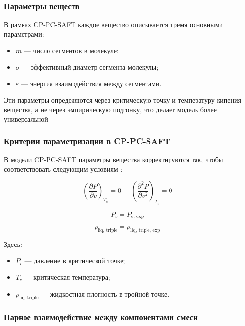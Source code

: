 \documentclass[a4paper,12pt]{article}
\begin{document}
\subsubsection{Параметры веществ}

В рамках CP-PC-SAFT каждое вещество описывается тремя основными параметрами:
\begin{itemize}
    \item \( m \) — число сегментов в молекуле;
    \item \( \sigma \) — эффективный диаметр сегмента молекулы;
    \item \( \varepsilon \) — энергия взаимодействия между сегментами.
\end{itemize}

Эти параметры определяются через критическую точку и температуру кипения вещества, а не через эмпирическую подгонку, что делает модель более универсальной.

\subsubsection{Критерии параметризации в CP-PC-SAFT}

В модели CP-PC-SAFT параметры вещества корректируются так, чтобы соответствовать следующим условиям \cite{polishuk2014standardized}:

\begin{equation}
\left( \frac{\partial P}{\partial v} \right)_{T_c} = 0, \quad
\left( \frac{\partial^2 P}{\partial v^2} \right)_{T_c} = 0
\end{equation}

\begin{equation}
P_c = P_{\text{c, exp}}
\end{equation}

\begin{equation}
\rho_{\text{liq, triple}} = \rho_{\text{liq, triple, exp}}
\end{equation}

Здесь:
\begin{itemize}
    \item \( P_c \) — давление в критической точке;
    \item \( T_c \) — критическая температура;
    \item \( \rho_{\text{liq, triple}} \) — жидкостная плотность в тройной точке.
\end{itemize}

\subsubsection{Парное взаимодействие между компонентами смеси}
\end{document}
